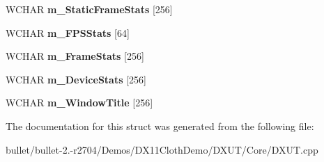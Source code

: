 \begin{DoxyCompactItemize}
\item 
\hypertarget{struct_d_x_u_t_state_1_1_s_t_a_t_e_aa4b70ae5dbeca009b9a185e49ba9bdee}{W\+C\+H\+A\+R {\bfseries m\+\_\+\+Static\+Frame\+Stats} \mbox{[}256\mbox{]}}\label{struct_d_x_u_t_state_1_1_s_t_a_t_e_aa4b70ae5dbeca009b9a185e49ba9bdee}

\item 
\hypertarget{struct_d_x_u_t_state_1_1_s_t_a_t_e_aa5ccc0bb5101ad554646aeacd2293c49}{W\+C\+H\+A\+R {\bfseries m\+\_\+\+F\+P\+S\+Stats} \mbox{[}64\mbox{]}}\label{struct_d_x_u_t_state_1_1_s_t_a_t_e_aa5ccc0bb5101ad554646aeacd2293c49}

\item 
\hypertarget{struct_d_x_u_t_state_1_1_s_t_a_t_e_ab5b65a32e46b0731bac65d4e891aa43d}{W\+C\+H\+A\+R {\bfseries m\+\_\+\+Frame\+Stats} \mbox{[}256\mbox{]}}\label{struct_d_x_u_t_state_1_1_s_t_a_t_e_ab5b65a32e46b0731bac65d4e891aa43d}

\item 
\hypertarget{struct_d_x_u_t_state_1_1_s_t_a_t_e_a54620fb74287643a6fcf5a63cad07a8c}{W\+C\+H\+A\+R {\bfseries m\+\_\+\+Device\+Stats} \mbox{[}256\mbox{]}}\label{struct_d_x_u_t_state_1_1_s_t_a_t_e_a54620fb74287643a6fcf5a63cad07a8c}

\item 
\hypertarget{struct_d_x_u_t_state_1_1_s_t_a_t_e_ad8779ed13105638022a10ba2e9810da9}{W\+C\+H\+A\+R {\bfseries m\+\_\+\+Window\+Title} \mbox{[}256\mbox{]}}\label{struct_d_x_u_t_state_1_1_s_t_a_t_e_ad8779ed13105638022a10ba2e9810da9}

\end{DoxyCompactItemize}


The documentation for this struct was generated from the following file\+:\begin{DoxyCompactItemize}
\item 
bullet/bullet-\/2.-\/r2704/\+Demos/\+D\+X11\+Cloth\+Demo/\+D\+X\+U\+T/\+Core/D\+X\+U\+T.\+cpp\end{DoxyCompactItemize}
